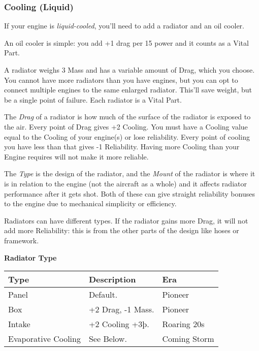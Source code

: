 \documentclass{article}
\begin{document}
\subsubsection{Cooling (Liquid)}
\label{_Cooling_(Liquid)}

If your engine is \emph{liquid-cooled}, you'll need to add a radiator
and an oil cooler.

An oil cooler is simple: you add +1 drag per 15 power and it counts as a
Vital Part.

A radiator weighs 3 Mass and has a variable amount of Drag, which you
choose. You cannot have more radiators than you have engines, but you
can opt to connect multiple engines to the same enlarged radiator.
This'll save weight, but be a single point of failure. Each radiator is
a Vital Part.

The \emph{Drag }of a radiator is how much of the surface of the radiator
is exposed to the air. Every point of Drag gives +2 Cooling. You must
have a Cooling value equal to the Cooling of your engine(s) or lose
reliability. Every point of cooling you have less than that gives -1
Reliability. Having more Cooling than your Engine requires will not make
it more reliable.

The \emph{Type }is the design of the radiator, and the \emph{Mount} of
the radiator is where it is in relation to the engine (not the aircraft
as a whole) and it affects radiator performance after it gets shot. Both
of these can give straight reliability bonuses to the engine due to
mechanical simplicity or efficiency.

Radiators can have different types. If the radiator gains more Drag, it
will not add more Reliability: this is from the other parts of the
design like hoses or framework.

\textbf{Radiator Type}

\begin{tabular}{|l|l|l|}
    \hline
    Type                & Description       & Era          \\\hline
    Panel               & Default.          & Pioneer      \\\hline
    Box                 & +2 Drag, -1 Mass. & Pioneer      \\\hline
    Intake              & +2 Cooling +3þ.   & Roaring 20s  \\\hline
    Evaporative Cooling & See Below.        & Coming Storm \\\hline
\end{tabular}
\end{document}

